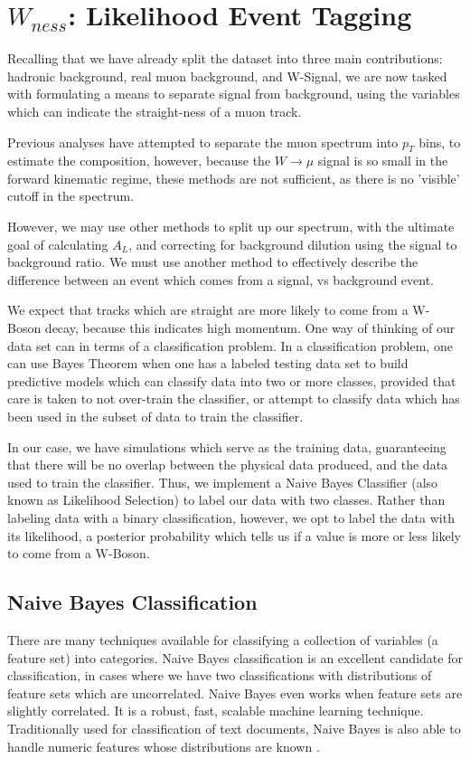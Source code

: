 \clearpage


\section{$W_{ness}$: Likelihood Event Tagging}
\label{sec:likelihood}

Recalling that we have already split the dataset into three main contributions:
hadronic background, real muon background, and W-Signal, we are now tasked with
formulating a means to separate signal from background, using the variables
which can indicate the straight-ness of a muon track.

Previous analyses have attempted to separate the muon spectrum into $p_T$ bins,
to estimate the composition, however, because the $W\rightarrow\mu$ signal is so
small in the forward kinematic regime, these methods are not sufficient, as
there is no 'visible' cutoff in the spectrum.

However, we may use other methods to split up our spectrum, with the ultimate
goal of calculating $A_L$, and correcting for background dilution using the
signal to background ratio. We must use another method to effectively describe
the difference between an event which comes from a signal, vs background event.

We expect that tracks which are straight are more likely to come from a W-Boson
decay, because this indicates high momentum. One way of thinking of our data set
can in terms of a classification problem. In a classification problem, one can
use Bayes Theorem when one has a labeled testing data set to build predictive
models which can classify data into two or more classes, provided that care is
taken to not over-train the classifier, or attempt to classify data which has
been used in the subset of data to train the classifier.

In our case, we have simulations which serve as the training data, guaranteeing
that there will be no overlap between the physical data produced, and the data
used to train the classifier. Thus, we implement a Naive Bayes Classifier (also
known as Likelihood Selection) to label our data with two classes. Rather than
labeling data with a binary classification, however, we opt to label the data
with its likelihood, a posterior probability which tells us if a value is more
or less likely to come from a W-Boson.

\subsection{Naive Bayes Classification}
There are many techniques available for classifying a collection of variables
(a feature set) into categories. Naive Bayes classification is an excellent
candidate for classification, in cases where we have two classifications with
distributions of feature sets which are uncorrelated. Naive Bayes even works when
feature sets are slightly correlated. It is a robust, fast, scalable machine
learning technique. Traditionally used for classification of text documents,
Naive Bayes is also able to handle numeric features whose distributions are
known \cite{Collins2013}.

